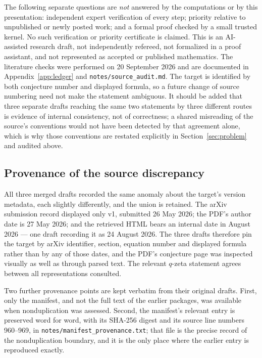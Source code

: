 \documentclass[11pt]{article}
\numberwithin{equation}{section}
\theoremstyle{definition}
\theoremstyle{remark}
\begin{document}
The following separate questions are \emph{not} answered by the computations
or by this presentation: independent expert verification of every step;
priority relative to unpublished or newly posted work; and a formal proof
checked by a small trusted kernel. No such verification or priority
certificate is claimed. This is an AI-assisted research draft, not
independently refereed, not formalized in a proof assistant, and not
represented as accepted or published mathematics. The literature checks were
performed on 20 September 2026 and are documented in
Appendix~\ref{app:ledger} and \texttt{notes/source\_audit.md}. The target is
identified by both conjecture number and displayed formula, so a future change
of source numbering need not make the statement ambiguous. It should be added
that three separate drafts reaching the same two statements by three different
routes is evidence of internal consistency, not of correctness; a shared
misreading of the source's conventions would not have been detected by that
agreement alone, which is why those conventions are restated explicitly in
Section~\ref{sec:problem} and audited above.

\subsection{Provenance of the source discrepancy}
\label{sec:discrepancy}

All three merged drafts recorded the same anomaly about the target's version
metadata, each slightly differently, and the union is retained. The arXiv
submission record displayed only v1, submitted 26 May 2026; the PDF's author
date is 27 May 2026; and the retrieved HTML bears an internal date in
August 2026 --- one draft recording it as 24 August 2026. The three drafts
therefore pin the target by arXiv identifier, section, equation number and
displayed formula rather than by any of those dates, and the PDF's conjecture
page was inspected visually as well as through parsed text. The relevant
$q$-zeta statement agrees between all representations consulted.

Two further provenance points are kept verbatim from their original drafts.
First, only the manifest, and not the full text of the earlier packages, was
available when nonduplication was assessed. Second, the manifest's relevant
entry is preserved word for word, with its SHA-256 digest and its source line
numbers 960--969, in \texttt{notes/manifest\_provenance.txt}; that file is the
precise record of the nonduplication boundary, and it is the only place where
the earlier entry is reproduced exactly.
\end{document}

